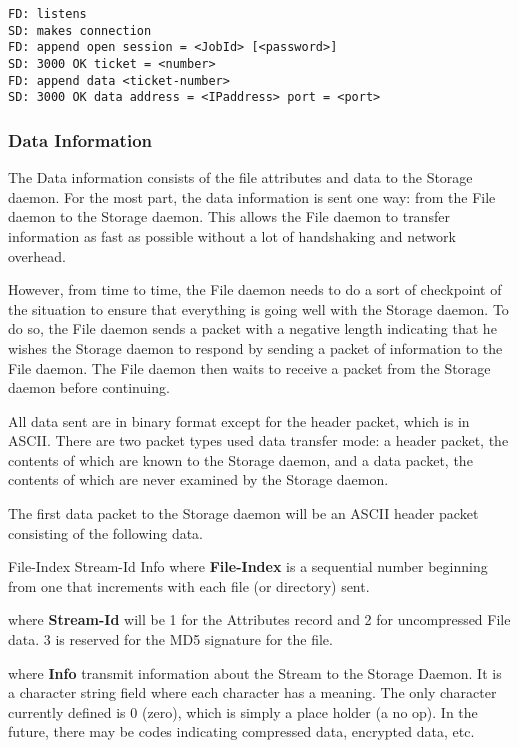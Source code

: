 \footnotesize
\begin{verbatim}
FD: listens
SD: makes connection
FD: append open session = <JobId> [<password>]
SD: 3000 OK ticket = <number>
FD: append data <ticket-number>
SD: 3000 OK data address = <IPaddress> port = <port>
\end{verbatim}
\normalsize

\subsubsection*{Data Information}

The Data information consists of the file attributes and data to the Storage
daemon. For the most part, the data information is sent one way: from the File
daemon to the Storage daemon. This allows the File daemon to transfer
information as fast as possible without a lot of handshaking and network
overhead. 

However, from time to time, the File daemon needs to do a sort of checkpoint
of the situation to ensure that everything is going well with the Storage
daemon. To do so, the File daemon sends a packet with a negative length
indicating that he wishes the Storage daemon to respond by sending a packet of
information to the File daemon. The File daemon then waits to receive a packet
from the Storage daemon before continuing. 

All data sent are in binary format except for the header packet, which is in
ASCII. There are two packet types used data transfer mode: a header packet,
the contents of which are known to the Storage daemon, and a data packet, the
contents of which are never examined by the Storage daemon. 

The first data packet to the Storage daemon will be an ASCII header packet
consisting of the following data. 

\lt{}File-Index\gt{} \lt{}Stream-Id\gt{} \lt{}Info\gt{} where {\bf
\lt{}File-Index\gt{}} is a sequential number beginning from one that
increments with each file (or directory) sent. 

where {\bf \lt{}Stream-Id\gt{}} will be 1 for the Attributes record and 2 for
uncompressed File data. 3 is reserved for the MD5 signature for the file. 

where {\bf \lt{}Info\gt{}} transmit information about the Stream to the
Storage Daemon. It is a character string field where each character has a
meaning. The only character currently defined is 0 (zero), which is simply a
place holder (a no op). In the future, there may be codes indicating
compressed data, encrypted data, etc. 

